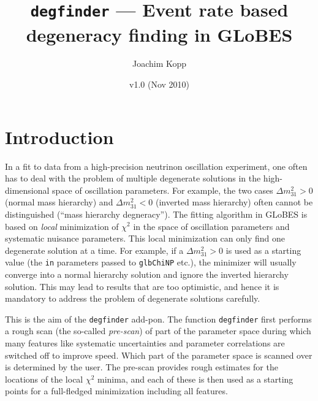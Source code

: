 \documentclass{article}
\title{{\tt degfinder} --- Event rate based degeneracy finding in GLoBES}
\author{Joachim Kopp}
\date{v1.0 (Nov 2010)}
\begin{document}
\maketitle

\begin{center}
\end{center}

\section{Introduction}

In a fit to data from a high-precision neutrinon oscillation experiment, one
often has to deal with the problem of multiple degenerate solutions in the
high-dimensional space of oscillation parameters. For example, the two cases
$\Delta m_{31}^2 > 0$ (normal mass hierarchy) and $\Delta m_{31}^2 < 0$ (inverted
mass hierarchy) often cannot be distinguished
(``mass hierarchy degneracy''). The fitting algorithm in GLoBES is based on 
\emph{local} minimization of $\chi^2$ in the space of oscillation parameters
and systematic nuisance parameters. This local minimization can only find
one degenerate solution at a time. For example, if a $\Delta m_{31}^2 > 0$
is used as a starting value (the {\tt in} parameters passed to {\tt glbChiNP}
etc.), the minimizer will usually converge into a normal hierarchy solution
and ignore the inverted hierarchy solution. This may lead to results that
are too optimistic, and hence it is mandatory to address the problem of
degenerate solutions carefully.

This is the aim of the {\tt degfinder} add-pon. The function {\tt degfinder}
first performs a rough scan (the so-called \emph{pre-scan}) of part of the
parameter space during which many features like systematic uncertainties
and parameter correlations are switched off to improve speed. Which part of
the parameter space is scanned over is determined by the user. The pre-scan
provides rough estimates for the locations of the local $\chi^2$ minima,
and each of these is then used as a starting points for a full-fledged
minimization including all features.
\end{document}

